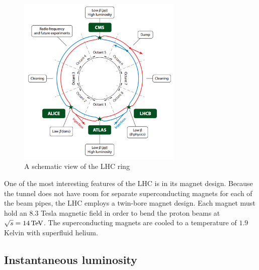 \begin{figure}[h!]
  \centering
  \captionsetup{justification=centering}

  \includegraphics[width=0.7\textwidth]{figures/LHC}
   \caption{A schematic view of the LHC ring ~\cite{LHCReview}}
  \label{fig:LHC}
\end{figure}

One of the most interesting features of the LHC is in its magnet design. Because the tunnel does not have room for separate superconducting magnets for each of the beam pipes, the LHC employs a twin-bore magnet design. Each magnet must hold an $8.3$ Tesla magnetic field in order to bend the proton beams at $\sqrt{s} = 14 \TeV$. The superconducting magnets are cooled to a temperature of $1.9$ Kelvin with superfluid helium.  

\subsection{Instantaneous luminosity}

